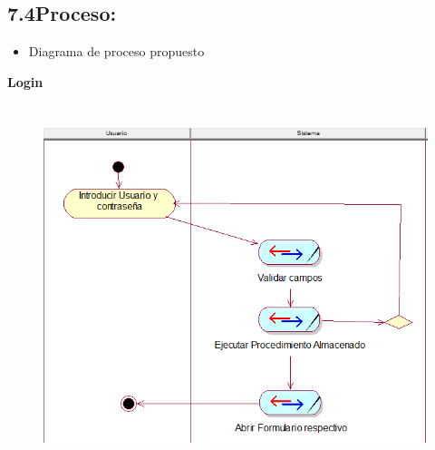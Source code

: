 \documentclass[12pt]{report}
\begin{document}

\newpage

\vspace{\baselineskip}\subsection*{7.4\hspace*{10pt}Proceso:}
\begin{itemize}
	\item {\fontsize{10pt}{12.0pt}\selectfont Diagrama de proceso propuesto\par}
\end{itemize}\par

\textbf{Login}\par




\begin{figure}[H]
	\begin{Center}
		\includegraphics[width=5.08in,height=4.17in]{./media/image4.png}
	\end{Center}
\end{figure}



\par
\end{document}

